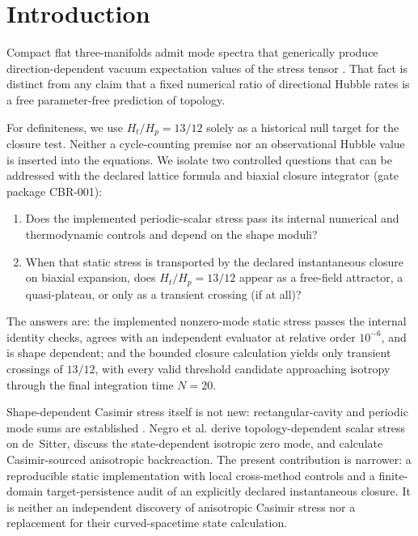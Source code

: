 \documentclass[aps,prd,reprint,superscriptaddress,nofootinbib,floatfix,showkeys]{revtex4-2}
\newcommand{\Ht}{H_{t}}
\newcommand{\Hp}{H_{p}}
\begin{document}

\maketitle

\section{Introduction}
\label{sec:intro}

Compact flat three-manifolds admit mode spectra that generically produce
direction-dependent vacuum expectation values of the stress tensor
\cite{birrell_davies_1982,lachieze_luminet_1995,edery2006}.
That fact is distinct from any claim that a fixed numerical ratio of
directional Hubble rates is a free parameter-free prediction of topology.

For definiteness, we use \(\Ht/\Hp=13/12\) solely as a historical null target
for the closure test.  Neither a cycle-counting premise nor an observational
Hubble value is inserted into the equations.  We isolate two controlled
questions that can be addressed with the declared lattice formula and
biaxial closure integrator (gate package CBR-001):

\begin{enumerate}
\item Does the implemented periodic-scalar stress pass its internal numerical
and thermodynamic controls and depend on the shape moduli?
\item When that static stress is transported by the declared instantaneous
closure on biaxial expansion, does
\(\Ht/\Hp=13/12\) appear as a free-field attractor, a quasi-plateau, or only
as a transient crossing (if at all)?
\end{enumerate}

The answers are: the implemented nonzero-mode static stress passes the internal
identity checks, agrees with an independent evaluator at relative order
\(10^{-6}\), and is shape dependent; and the bounded closure calculation yields only transient
crossings of \(13/12\), with every valid threshold candidate approaching
isotropy through the final integration time \(N=20\).

Shape-dependent Casimir stress itself is not new: rectangular-cavity and
periodic mode sums are established \cite{edery2006}. Negro et al.
\cite{negro2026} derive topology-dependent scalar stress on de~Sitter,
discuss the state-dependent isotropic zero mode, and calculate
Casimir-sourced anisotropic backreaction. The present contribution is narrower:
a reproducible static implementation with local cross-method controls and a
finite-domain target-persistence audit of an explicitly declared
instantaneous closure. It is neither an independent discovery of anisotropic
Casimir stress nor a replacement for their curved-spacetime state calculation.
\end{document}
